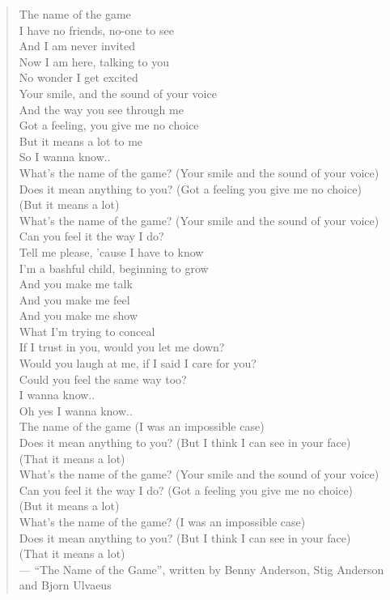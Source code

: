 \begin{verse}
The name of the game \\[1\baselineskip]

I have no friends, no-one to see \\
And I am never invited \\
Now I am here, talking to you \\
No wonder I get excited \\[1\baselineskip]

Your smile, and the sound of your voice \\
And the way you see through me \\
Got a feeling, you give me no choice \\
But it means a lot to me \\
So I wanna know.. \\[1\baselineskip]

What's the name of the game? (Your smile and the sound of your voice) \\
Does it mean anything to you? (Got a feeling you give me no choice) \\
(But it means a lot) \\
What's the name of the game? (Your smile and the sound of your voice) \\
Can you feel it the way I do? \\
Tell me please, 'cause I have to know \\
I'm a bashful child, beginning to grow \\[1\baselineskip]

And you make me talk \\
And you make me feel \\
And you make me show \\
What I'm trying to conceal \\
If I trust in you, would you let me down? \\
Would you laugh at me, if I said I care for you? \\
Could you feel the same way too? \\
I wanna know.. \\
Oh yes I wanna know.. \\[1\baselineskip]

The name of the game (I was an impossible case) \\
Does it mean anything to you? (But I think I can see in your face) \\
(That it means a lot) \\
What's the name of the game? (Your smile and the sound of your voice) \\
Can you feel it the way I do? (Got a feeling you give me no choice) \\
(But it means a lot) \\
What's the name of the game? (I was an impossible case) \\
Does it mean anything to you? (But I think I can see in your face) \\
(That it means a lot) \\
--- \enquote{The Name of the Game}, written by Benny Anderson, Stig Anderson and Bjorn Ulvaeus
\end{verse}
